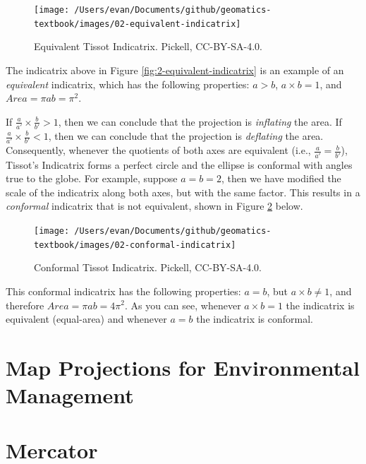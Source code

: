 \documentclass[
]{book}
\begin{document}
\begin{figure}
\texttt{[image: /Users/evan/Documents/github/geomatics-textbook/images/02-equivalent-indicatrix]} \caption{Equivalent Tissot Indicatrix. Pickell, CC-BY-SA-4.0.}\label{fig:2-reference-equivalent}
\end{figure}

The indicatrix above in Figure \ref{fig:2-equivalent-indicatrix} is an example of an \emph{equivalent} indicatrix, which has the following properties: \(a>b\), \(a×b=1\), and \(Area=πab=π^2\).

If \(\frac{a}{a'}×\frac{b}{b'}>1\), then we can conclude that the projection is \emph{inflating} the area. If \(\frac{a}{a'}×\frac{b}{b'}<1\), then we can conclude that the projection is \emph{deflating} the area. Consequently, whenever the quotients of both axes are equivalent (i.e., \(\frac{a}{a'}=\frac{b}{b'}\)), Tissot's Indicatrix forms a perfect circle and the ellipse is conformal with angles true to the globe. For example, suppose \(a=b=2\), then we have modified the scale of the indicatrix along both axes, but with the same factor. This results in a \emph{conformal} indicatrix that is not equivalent, shown in Figure \ref{fig:2-conformal-indicatrix} below.

\begin{figure}
\texttt{[image: /Users/evan/Documents/github/geomatics-textbook/images/02-conformal-indicatrix]} \caption{Conformal Tissot Indicatrix. Pickell, CC-BY-SA-4.0.}\label{fig:2-conformal-indicatrix}
\end{figure}

This conformal indicatrix has the following properties: \(a=b\), but \(a×b≠1\), and therefore \(Area=πab=4π^2\). As you can see, whenever \(a×b=1\) the indicatrix is equivalent (equal-area) and whenever \(a=b\) the indicatrix is conformal.

\hypertarget{map-projections-for-environmental-management}{%
\section{Map Projections for Environmental Management}\label{map-projections-for-environmental-management}}

\hypertarget{mercator}{%
\section{Mercator}\label{mercator}}
\end{document}
